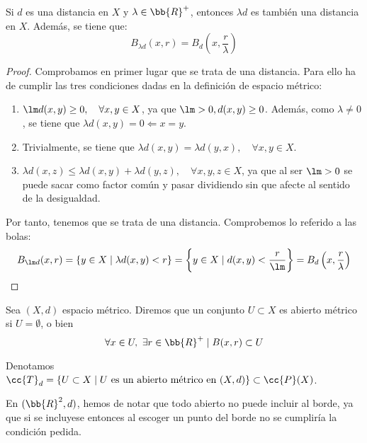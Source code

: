 \begin{prop}
    Si $d$ es una distancia en $X$ y $\lambda\in \bb{R}^+$, entonces $\lambda d$ es también una distancia en $X$. Además, se tiene que:
    \begin{equation*}
        B_{\lambda d}(x,r) = B_d\left(x, \frac{r}{\lambda}\right)
    \end{equation*}
\end{prop}
\begin{proof}
    Comprobamos en primer lugar que se trata de una distancia. Para ello ha de cumplir las tres condiciones dadas en la definición de espacio métrico:
    \begin{enumerate}
        \item $\lm d(x,y)\geq 0, \quad \forall x,y\in X$, ya que $\lm>0, d(x,y)\geq 0$. Además, como $\lambda\neq 0$, se tiene que $\lambda d(x,y)=0 \Longleftarrow x=y$.

        \item Trivialmente, se tiene que $\lambda d(x,y)=\lambda d(y,x), \quad \forall x,y\in X$.

        \item $\lambda d(x,z)\leq \lambda d(x,y) + \lambda d(y,z), \quad \forall x,y,z\in X$, ya que al ser $\lm>0$ se puede sacar como factor común y pasar dividiendo sin que afecte al sentido de la desigualdad.
    \end{enumerate}

    Por tanto, tenemos que se trata de una distancia. Comprobemos lo referido a las bolas:
    \begin{equation*}
        B_{\lm d}(x,r)
        = \{y\in X \mid \lambda d(x,y)<r\}
        = \left\{y\in X \mid d(x,y)<\dfrac{r}{\lm}\right\}
        = B_d\left(x, \frac{r}{\lambda}\right)
    \end{equation*}
\end{proof}

\begin{definicion}
Sea $(X,d)$ espacio métrico. Diremos que un conjunto $U\subset X$ es abierto métrico si $U=\emptyset$, o bien
$$\forall x\in U,~\exists r\in \bb{R}^+\mid B(x,r)\subset U$$

Denotamos $\cc{T}_d=\{U\subset X\mid U\text{ es un abierto métrico en } (X,d)\}\subset \cc{P}(X)$. 
\end{definicion}

\begin{ejemplo}
    En $(\bb{R}^2, d)$, hemos de notar que todo abierto no puede incluir al borde, ya que si se incluyese entonces al escoger un punto del borde no se cumpliría la condición pedida.
\end{ejemplo}


